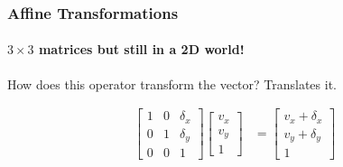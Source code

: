 \documentclass[xcolor=dvipsnames]{beamer}
\begin{document}
\begin{frame}
\frametitle{Affine Transformations}
\framesubtitle{$3 \times 3$ matrices but still in a 2D world!}

  How does this operator transform the vector? Translates it.

  \begin{align*}
    \left[ \begin{array}{rrr}
      1 & 0 & \delta_x \\
      0 & 1 & \delta_y \\
      0 & 0 & 1
      \end{array} \right]
    \left[ \begin{array}{r}
      v_x \\
      v_y \\
      1
      \end{array} \right]
    & =
    \left[ \begin{array}{r}
      v_x + \delta_x  \\
      v_y + \delta_y  \\
      1
      \end{array} \right]
    \end{align*}

  \end{frame}
\end{document}
